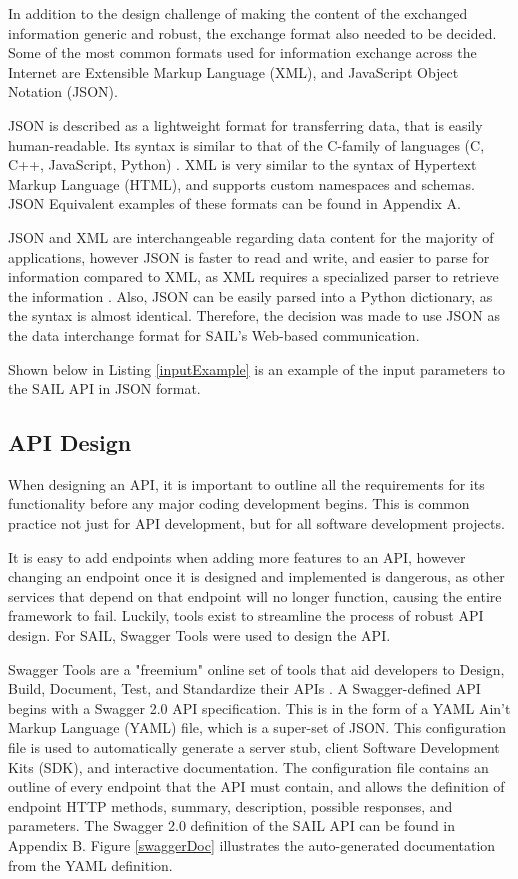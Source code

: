 \documentclass[10pt, titlepage, onecolumn, openany]{article}
\begin{document}
In addition to the design challenge of making the content of
the exchanged information generic and robust, the
exchange format also needed to be decided. Some of the most
common formats used for information exchange across the Internet
are Extensible Markup Language (XML), and JavaScript Object
Notation (JSON).

JSON is described as a lightweight format
for transferring data, that is easily human-readable. Its
syntax is similar to that of the C-family of languages (C,
C++, JavaScript, Python) \cite{jsonsumm}. XML is very similar
to the syntax of Hypertext Markup Language (HTML), and supports
custom namespaces and schemas. JSON Equivalent
examples of these formats can be found in Appendix A.

JSON and XML are interchangeable regarding data content for the
majority of applications, however JSON is faster to read and write,
and easier to parse for information compared to XML, as XML requires
a specialized parser to retrieve the information \cite{xmljson}.
Also, JSON can be easily parsed into a Python dictionary, as the
syntax is almost identical. Therefore, the decision was made to use
JSON as the data interchange format for SAIL's Web-based
communication.

Shown below in Listing \ref{inputExample} is an example of the input
parameters to the SAIL API in JSON format.



\subsection{API Design}
When designing an API, it is important to outline all the requirements
for its functionality before any major coding development begins.
This is common practice not just for API development, but for all
software development projects.

It is easy to add endpoints when adding more features to an API,
however changing an endpoint once it is designed and implemented is
dangerous, as other services that depend on that endpoint will no
longer function, causing the entire framework to fail. Luckily, tools
exist to streamline the process of robust API design. For SAIL,
Swagger Tools were used to design the API.

Swagger Tools are a "freemium" online set of tools that aid developers
to Design, Build, Document, Test, and Standardize their APIs
\cite{swagHome}. A Swagger-defined API begins with a Swagger 2.0 API
specification. This is in the form of a YAML Ain't Markup Language
(YAML) file, which is a super-set of JSON. This configuration file
is used to automatically generate a server stub, client Software
Development Kits (SDK), and interactive documentation. The
configuration file contains an outline of every endpoint that
the API must contain, and allows the definition of endpoint HTTP
methods, summary, description, possible responses, and parameters.
The Swagger 2.0 definition of the SAIL API can be found in Appendix B.
Figure \ref{swaggerDoc} illustrates the auto-generated documentation
from the YAML definition.
\end{document}
